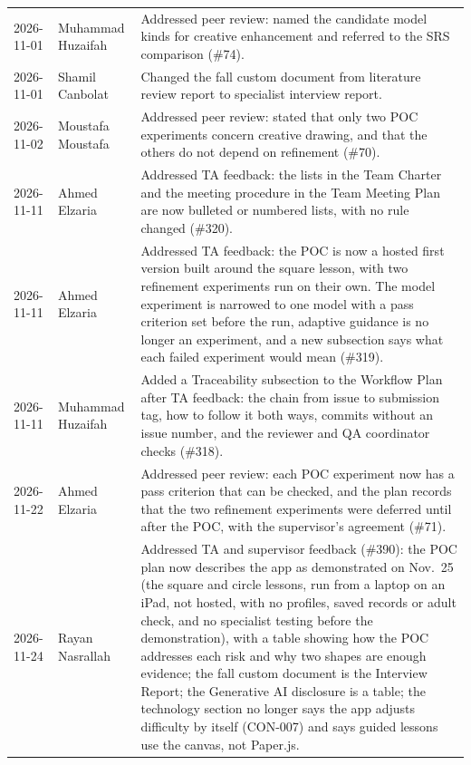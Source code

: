 \documentclass{article}
\begin{document}
\begin{table}[hp]
\begin{tabularx}{\textwidth}{lP{0.25\textwidth}Y}
2026-11-01 & Muhammad Huzaifah &
Addressed peer review: named the candidate model kinds for creative enhancement and referred to the SRS comparison (\#74). \\
2026-11-01 & Shamil Canbolat & Changed the fall custom document from
literature review report to specialist interview report. \\
2026-11-02 & Moustafa Moustafa & Addressed peer review: stated that only
two POC experiments concern creative drawing, and that the others do not
depend on refinement (\#70). \\
2026-11-11 & Ahmed Elzaria & Addressed TA feedback: the lists in the Team
Charter and the meeting procedure in the Team Meeting Plan are now bulleted or
numbered lists, with no rule changed (\#320). \\
2026-11-11 & Ahmed Elzaria & Addressed TA feedback: the POC is now a hosted
first version built around the square lesson, with two refinement experiments
run on their own. The model experiment is narrowed to one model with a pass
criterion set before the run, adaptive guidance is no longer an experiment, and
a new subsection says what each failed experiment would mean (\#319). \\
2026-11-11 & Muhammad Huzaifah & Added a Traceability subsection to the
Workflow Plan after TA feedback: the chain from issue to submission tag, how to
follow it both ways, commits without an issue number, and the reviewer and QA
coordinator checks (\#318). \\
2026-11-22 & Ahmed Elzaria & Addressed peer review: each POC experiment now
has a pass criterion that can be checked, and the plan records that the two
refinement experiments were deferred until after the POC, with the
supervisor's agreement (\#71). \\
2026-11-24 & Rayan Nasrallah & Addressed TA and supervisor feedback
(\#390): the POC plan now describes the app as demonstrated on Nov.~25 (the
square and circle lessons, run from a laptop on an iPad, not hosted, with no
profiles, saved records or adult check, and no specialist testing before the
demonstration), with a table showing how the POC addresses each risk and why
two shapes are enough evidence; the fall custom
document is the Interview Report; the Generative AI disclosure is a table;
the technology section no longer says the app adjusts difficulty by itself
(CON-007) and says guided lessons use the canvas, not Paper.js. \\
\bottomrule
\end{tabularx}
\end{table}
\end{document}
